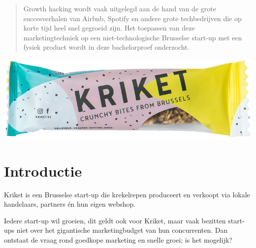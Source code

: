\documentclass[a0,portrait]{a0poster}
\begin{document}
\begin{multicols}{2} %


\color{HoGentAccent1} %

\begin{abstract}
Growth hacking wordt vaak uitgelegd aan de hand van de grote succesverhalen van Airbnb, Spotify en andere grote techbedrijven die op korte tijd heel snel gegroeid zijn. Het toepassen van deze marketingtechniek op een niet-technologische Brusselse start-up met een fysiek product wordt in deze bachelorproef onderzocht.
\end{abstract}

\begin{center}\vspace{1cm}
	\includegraphics[width=1.0\linewidth]{kriketbar}
\end{center}


\color{HoGentAccent1} 
\section*{Introductie}
\color{black}
Kriket is een Brusselse start-up die krekelrepen produceert en verkoopt via lokale handelaars, partners én hun eigen webshop. 

Iedere start-up wil groeien, dit geldt ook voor Kriket, maar vaak bezitten start-ups niet over het gigantische marketingbudget van hun concurrenten. Dan ontstaat de vraag rond goedkope marketing en snelle groei; is het mogelijk?


\end{multicols}
\end{document}
